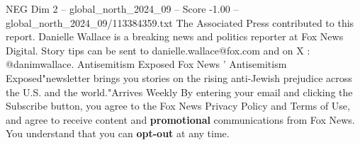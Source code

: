 \begin{textsample}{NEG Dim 2 – global\_north\_2024\_09 – Score -1.00 – global\_north\_2024\_09/113384359.txt}
The Associated Press contributed to this report.
Danielle Wallace is a breaking news and politics reporter at Fox News Digital.
Story tips can be sent to danielle.wallace@fox.com and on X : @danimwallace.
Antisemitism Exposed Fox News ' Antisemitism Exposed"newsletter brings you stories on the rising anti-Jewish prejudice across the U.S. and the world."Arrives Weekly By entering your email and clicking the Subscribe button, you agree to the Fox News Privacy Policy and Terms of Use, and agree to receive content and \textbf{promotional} communications from Fox News.
You understand that you can \textbf{opt-out} at any time.

\end{textsample}
